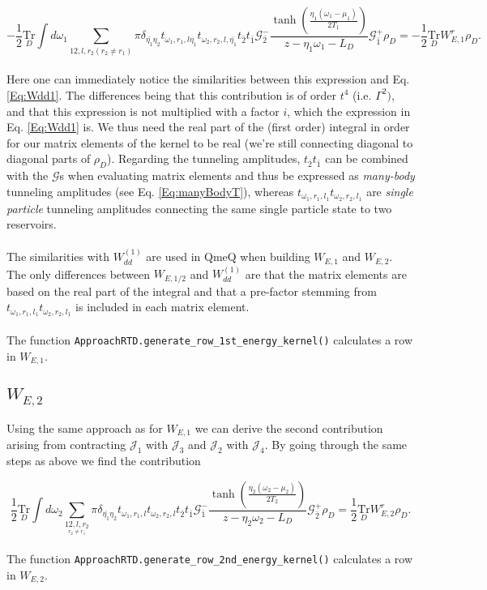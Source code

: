 \documentclass{article}
\newcommand{\G}{\ensuremath{\mathcal{G}}}
\newcommand{\J}{\ensuremath{\mathcal{J}}}
\newcommand{\Tru}[1]{\ensuremath{\underset{#1}{\text{Tr}}}}
\begin{document}
\begin{equation}
     -\frac{1}{2}\Tru{D} \int d\omega_1\sum_{12,l,r_2 (r_2\ne r_1)}\pi\delta_{\bar{\eta_1}\eta_2}t_{\omega_1, r_1, l\eta_1}t_{\omega_2, r_2, l,\bar{\eta_1}}t_{\bar{2}}t_{\bar{1}}\G^-_{\bar{2}}\frac{\tanh\left ( \frac{\eta_1(\omega_1-\mu_1)}{2T_1} \right )}{z-\eta_1\omega_1-L_D}\G^{+}_{\bar{1}}\rho_D = -\frac{1}{2}\Tru{D} W_{E,1}^r\rho_D.
\end{equation}
\\
Here one can immediately notice the similarities between this expression and Eq. \ref{Eq:Wdd1}. The differences being that this contribution is of order $t^4$ (i.e. $\Gamma^2)$, and that this expression is not multiplied with a factor $i$, which the expression in Eq. \ref{Eq:Wdd1} is. We thus need the real part of the (first order) integral in order for our matrix elements of the kernel to be real (we're still connecting diagonal to diagonal parts of $\rho_D$). Regarding the tunneling amplitudes, $t_{\bar{2}}t_{\bar{1}}$ can be combined with the $\G$s when evaluating matrix elements and thus be expressed as \textit{many-body} tunneling amplitudes (see Eq. \ref{Eq:manyBodyT}), whereas $t_{\omega_1, r_1, l_1}t_{\omega_2, r_2, l_1}$ are \textit{single particle} tunneling amplitudes connecting the same single particle state to two reservoirs.
\\
\\
The similarities with $W_{dd}^{(1)}$ are used in QmeQ when building $W_{E,1}$ and $W_{E,2}$. The only differences between $W_{E,1/2}$ and $W_{dd}^{(1)}$ are that the matrix elements are based on the real part of the integral and that a pre-factor stemming from $t_{\omega_1, r_1, l_1}t_{\omega_2, r_2, l_1}$ is included in each matrix element.
\\
\\ 
The function \verb!ApproachRTD.generate_row_1st_energy_kernel()! calculates a row in $W_{E,1}$.
 \subsection{$W_{E,2}$}

Using the same approach as for $W_{E,1}$ we can derive the second contribution arising from contracting $\J_1$ with $\J_3$ and $\J_2$ with $\J_4$. By going through the same steps as above we find the contribution

\begin{equation}
     \frac{1}{2}\Tru{D} \int d\omega_2\sum_{\underset{r_2\ne r_1}{12,l,r_2}}\pi\delta_{\bar{\eta_1}\eta_2}t_{\omega_1, r_1, l}t_{\omega_2, r_2, l}t_{\bar{2}}t_{\bar{1}}\G^-_{\bar{1}}\frac{\tanh\left ( \frac{\eta_2(\omega_2-\mu_2)}{2T_2} \right )}{z-\eta_2\omega_2-L_D}\G^{+}_{\bar{2}}\rho_D = \frac{1}{2}\Tru{D} W_{E,2}^r\rho_D.
\end{equation}
\\
The function \verb!ApproachRTD.generate_row_2nd_energy_kernel()! calculates a row in $W_{E,2}$.
\end{document}

